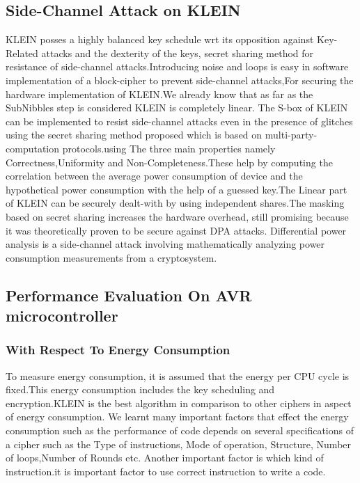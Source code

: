 \documentclass[preprint]{transcrypto}
\begin{document}
\subsection{Side-Channel Attack on KLEIN  \cite{Heuser2016SideChannelAO} \cite{DBLP:journals/joc/NikovaRS11}}
KLEIN posses a highly balanced key schedule wrt its opposition against Key-Related attacks and the dexterity of the keys, secret sharing method for resistance of side-channel attacks.Introducing noise and loops is easy in software implementation of a block-cipher to prevent side-channel attacks,For securing the hardware implementation of KLEIN.We already know that as far as the SubNibbles step is considered KLEIN is completely linear. The S-box of KLEIN can be implemented to resist side-channel attacks even in the presence of glitches using the secret sharing method proposed which is based on multi-party-computation protocols.using The three main properties namely Correctness,Uniformity and Non-Completeness.These help by computing the correlation between the average power consumption of device and the hypothetical power consumption with the help of a guessed key.The Linear part of KLEIN can be securely dealt-with by using independent shares.The masking based on secret sharing increases the hardware overhead, still promising because it was theoretically proven to be secure against DPA attacks. Differential power analysis is a side-channel attack involving mathematically analyzing power consumption measurements from a cryptosystem.\\

\subsection{Performance Evaluation On AVR microcontroller \cite{Alizadeh2012SecurityAP}} 

\subsubsection{With Respect To Energy Consumption}
To measure energy consumption, it is assumed that
the energy per CPU cycle is fixed.This energy consumption
includes the key scheduling and encryption.KLEIN is the best algorithm in comparison to other ciphers in aspect of energy consumption. We learnt many important factors that effect the energy consumption such as the performance of code depends on several specifications of a cipher such as
the Type of instructions, Mode of operation, Structure, Number of loops,Number of Rounds etc. Another important factor is which kind of instruction.it is important factor to use correct instruction
to write a code.\\
\end{document}
